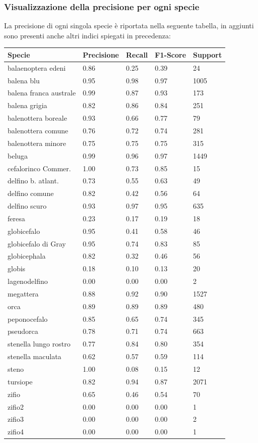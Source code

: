 \documentclass[a4paper,final,12pt]{report}
\begin{document}
\subsubsection{Visualizzazione della precisione per ogni specie}
La precisione di ogni singola specie è riportata nella seguente tabella, in aggiunti sono presenti anche altri indici spiegati in precedenza:
\begin{longtable}{p{}p{}p{}p{}p{}}
\toprule
\textbf{Specie} & \textbf{Precisione} & \textbf{Recall} & \textbf{F1-Score} & \textbf{Support} \\
\midrule
\endfirsthead
%
\endhead
%
\bottomrule
%
\endlastfoot
%
balaenoptera edeni & 0.86 & 0.25 & 0.39 & 24 \\
balena blu & 0.95 & 0.98 & 0.97 & 1005 \\
balena franca australe & 0.99 & 0.87 & 0.93 & 173 \\
balena grigia & 0.82 & 0.86 & 0.84 & 251 \\
balenottera boreale & 0.93 & 0.66 & 0.77 & 79 \\
balenottera comune & 0.76 & 0.72 & 0.74 & 281 \\
balenottera minore & 0.75 & 0.75 & 0.75 & 315 \\
beluga & 0.99 & 0.96 & 0.97 & 1449 \\
cefalorinco Commer. & 1.00 & 0.73 & 0.85 & 15 \\
delfino b. atlant. & 0.73 & 0.55 & 0.63 & 49 \\
delfino comune & 0.82 & 0.42 & 0.56 & 64 \\
delfino scuro & 0.93 & 0.97 & 0.95 & 635 \\
feresa & 0.23 & 0.17 & 0.19 & 18 \\
globicefalo & 0.95 & 0.41 & 0.58 & 46 \\
globicefalo di Gray & 0.95 & 0.74 & 0.83 & 85 \\
globicephala & 0.82 & 0.32 & 0.46 & 56 \\
globis & 0.18 & 0.10 & 0.13 & 20 \\
lagenodelfino & 0.00 & 0.00 & 0.00 & 2 \\
megattera & 0.88 & 0.92 & 0.90 & 1527 \\
orca & 0.89 & 0.89 & 0.89 & 480 \\
peponocefalo & 0.85 & 0.65 & 0.74 & 345 \\
pseudorca & 0.78 & 0.71 & 0.74 & 663 \\
stenella lungo rostro & 0.77 & 0.84 & 0.80 & 354 \\
stenella maculata & 0.62 & 0.57 & 0.59 & 114 \\
steno & 1.00 & 0.08 & 0.15 & 12 \\
tursiope & 0.82 & 0.94 & 0.87 & 2071 \\
zifio & 0.65 & 0.46 & 0.54 & 70 \\
zifio2 & 0.00 & 0.00 & 0.00 & 1 \\
zifio3 & 0.00 & 0.00 & 0.00 & 2 \\
zifio4 & 0.00 & 0.00 & 0.00 & 1 \\
\end{longtable}
\end{document}
